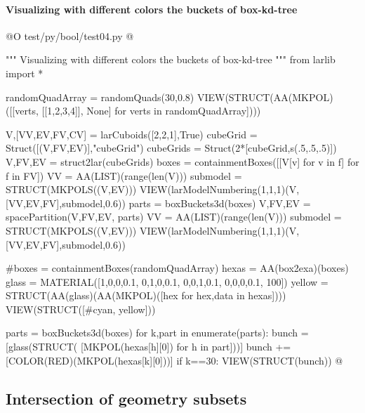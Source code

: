 \documentclass[11pt,oneside]{article}    %
\begin{document}
\paragraph{Visualizing with different colors the buckets of box-kd-tree}
@O test/py/bool/test04.py @{
""" Visualizing with different colors the buckets of box-kd-tree """
from larlib import *

randomQuadArray = randomQuads(30,0.8)
VIEW(STRUCT(AA(MKPOL)([[verts, [[1,2,3,4]], None] for verts in randomQuadArray])))

V,[VV,EV,FV,CV] = larCuboids([2,2,1],True)
cubeGrid = Struct([(V,FV,EV)],"cubeGrid")
cubeGrids = Struct(2*[cubeGrid,s(.5,.5,.5)])
V,FV,EV = struct2lar(cubeGrids)
boxes = containmentBoxes([[V[v] for v in f] for f in FV])
VV = AA(LIST)(range(len(V)))
submodel = STRUCT(MKPOLS((V,EV)))
VIEW(larModelNumbering(1,1,1)(V,[VV,EV,FV],submodel,0.6)) 
parts = boxBuckets3d(boxes)
V,FV,EV = spacePartition(V,FV,EV, parts)
VV = AA(LIST)(range(len(V)))
submodel = STRUCT(MKPOLS((V,EV)))
VIEW(larModelNumbering(1,1,1)(V,[VV,EV,FV],submodel,0.6)) 


#boxes = containmentBoxes(randomQuadArray)
hexas = AA(box2exa)(boxes)
glass = MATERIAL([1,0,0,0.1,  0,1,0,0.1,  0,0,1,0.1, 0,0,0,0.1, 100])
yellow = STRUCT(AA(glass)(AA(MKPOL)([hex for hex,data in hexas])))
VIEW(STRUCT([#cyan,
    yellow]))

parts = boxBuckets3d(boxes)
for k,part in enumerate(parts):
    bunch = [glass(STRUCT( [MKPOL(hexas[h][0]) for h in part]))]
    bunch += [COLOR(RED)(MKPOL(hexas[k][0]))]
    if k==30: VIEW(STRUCT(bunch))
@}


\subsection{Intersection of geometry subsets}
\end{document}
